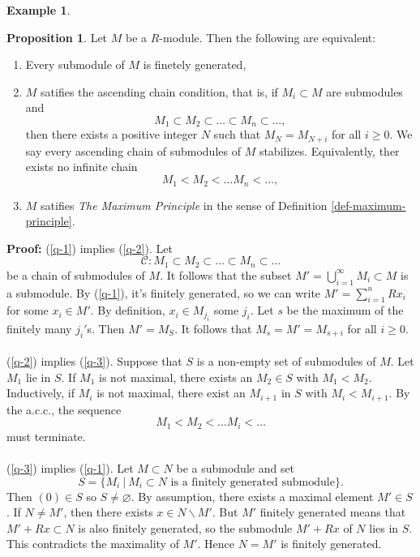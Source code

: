 \documentclass[11pt]{amsbook}%
\newcommand{\ii}{\item}
\theoremstyle{plain}
\theoremstyle{definition}
\newtheorem*{example*}{Example}
\newtheorem{proposition}[theorem]{Proposition}
\numberwithin{equation}{section}
\newcommand{\CK}{\mathcal C}
\renewcommand{\proof}{ \textbf{Proof: }}
\begin{document}
\begin{example*}
\begin{proposition}
  Let $M$ be a $R$-module. Then the following are equivalent:
  \begin{enumerate}[(1) ]
      \ii \label{q-1} Every submodule of $M$ is finetely generated,
      \ii \label{q-2} $M$ satifies the ascending chain condition, that is, if $M_{i} \subset M$
      are submodules and
      $$
      M_{1} \subset M_{2} \subset \dots \subset M_{n} \subset \dots,
      $$
      then there exists a positive integer $N$ such that $M_{N} = M_{N+i}$ for all $i \geq 0$.
      We say every ascending chain of submodules of $M$ stabilizes. Equivalently,
      ther exists no infinite chain 
      $$
      M_{1} < M_{2} < \dots M_{n} < \dots,
      $$
      \ii \label{q-3} $M$ satifies \textit{The Maximum Principle} in the sense of
      Definition \ref{def-maximum-principle}.
  \end{enumerate}
\end{proposition} \vspace{1.8em}
\proof (\ref{q-1}) implies (\ref{q-2}). Let
$$
\CK: M_{1} \subset M_{2} \subset \dots \subset M_{n} \subset \dots  
$$
be a chain of submodules of $M$. It follows that the subset $M' = \bigcup_{i=1}^{\infty} M_{i} \subset M$
is a submodule. By (\ref{q-1}), it's finitely generated, so we can write $M' = \sum_{i=1}^{n} Rx_{i}$
for some $x_{i} \in M'$. By definition, $x_{i} \in M_{j_{i}}$ some $j_{i}$. Let
$s$ be the maximum of the finitely many $j_{i}'$s. Then $M' = M_{S}$. It follows
that $M_{s} = M' = M_{s+i}$ for all $i \geq 0$. \\  \\
(\ref{q-2}) implies (\ref{q-3}). Suppose that $S$ is a non-empty set of submodules of $M$.
Let $M_{1}$ lie in $S$. If $M_{1}$ is not maximal, there exists an $M_{2} \in S$ with
$M_{1} < M_{2}$. Inductively, if $M_{i}$ is not maximal, there exist an $M_{i+1}$ in $S$
with $M_{i} < M_{i+1}$. By the a.c.c., the sequence
$$
M_{1} < M_{2} < \dots M_{i} < \dots
$$
must terminate. \\ \\
(\ref{q-3}) implies (\ref{q-1}). Let $M \subset N$ be a submodule and set
$$
S = \{M_{i} \ | \ M_{i} \subset N \text{ is a finitely generated submodule} \}.
$$
Then $(0) \in S$ so $S \neq \varnothing$. By assumption, there exists a maximal element
$M' \in S$. If $N \neq M'$, then there exists $x \in N\backslash M'$. But $M'$
finitely generated means that $M' + Rx \subset N$ is also finitely generated, so
the submodule $M' + Rx$ of $N$ lies in $S$. This contradicts the maximality
of $M'$. Hence $N = M'$ is finitely generated. \qedsymbol


\end{example*}
\end{document}
